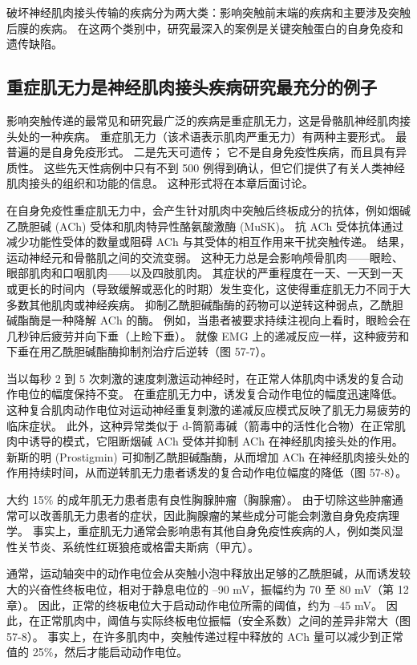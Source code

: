 破坏神经肌肉接头传输的疾病分为两大类：影响突触前末端的疾病和主要涉及突触后膜的疾病。 在这两个类别中，研究最深入的案例是关键突触蛋白的自身免疫和遗传缺陷。

\subsection{重症肌无力是神经肌肉接头疾病研究最充分的例子}
影响突触传递的最常见和研究最广泛的疾病是重症肌无力，这是骨骼肌神经肌肉接头处的一种疾病。 重症肌无力（该术语表示肌肉严重无力）有两种主要形式。 最普遍的是自身免疫形式。 二是先天可遗传； 它不是自身免疫性疾病，而且具有异质性。 这些先天性病例中只有不到 500 例得到确认，但它们提供了有关人类神经肌肉接头的组织和功能的信息。 这种形式将在本章后面讨论。

在自身免疫性重症肌无力中，会产生针对肌肉中突触后终板成分的抗体，例如烟碱乙酰胆碱 (ACh) 受体和肌肉特异性酪氨酸激酶 (MuSK)。 抗 ACh 受体抗体通过减少功能性受体的数量或阻碍 ACh 与其受体的相互作用来干扰突触传递。 结果，运动神经元和骨骼肌之间的交流变弱。 这种无力总是会影响颅骨肌肉——眼睑、眼部肌肉和口咽肌肉——以及四肢肌肉。 其症状的严重程度在一天、一天到一天或更长的时间内（导致缓解或恶化的时期）发生变化，这使得重症肌无力不同于大多数其他肌肉或神经疾病。 抑制乙酰胆碱酯酶的药物可以逆转这种弱点，乙酰胆碱酯酶是一种降解 ACh 的酶。 例如，当患者被要求持续注视向上看时，眼睑会在几秒钟后疲劳并向下垂（上睑下垂）。 就像 EMG 上的递减反应一样，这种疲劳和下垂在用乙酰胆碱酯酶抑制剂治疗后逆转（图 57-7）。

当以每秒 2 到 5 次刺激的速度刺激运动神经时，在正常人体肌肉中诱发的复合动作电位的幅度保持不变。 在重症肌无力中，诱发复合动作电位的幅度迅速降低。 这种复合肌肉动作电位对运动神经重复刺激的递减反应模式反映了肌无力易疲劳的临床症状。 此外，这种异常类似于 d-筒箭毒碱（箭毒中的活性化合物）在正常肌肉中诱导的模式，它阻断烟碱 ACh 受体并抑制 ACh 在神经肌肉接头处的作用。 新斯的明 (Prostigmin) 可抑制乙酰胆碱酯酶，从而增加 ACh 在神经肌肉接头处的作用持续时间，从而逆转肌无力患者诱发的复合动作电位幅度的降低（图 57-8）。

大约 15\% 的成年肌无力患者患有良性胸腺肿瘤（胸腺瘤）。 由于切除这些肿瘤通常可以改善肌无力患者的症状，因此胸腺瘤的某些成分可能会刺激自身免疫病理学。 事实上，重症肌无力通常会影响患有其他自身免疫性疾病的人，例如类风湿性关节炎、系统性红斑狼疮或格雷夫斯病（甲亢）。

通常，运动轴突中的动作电位会从突触小泡中释放出足够的乙酰胆碱，从而诱发较大的兴奋性终板电位，相对于静息电位的 –90 mV，振幅约为 70 至 80 mV（第 12 章）。 因此，正常的终板电位大于启动动作电位所需的阈值，约为 –45 mV。 因此，在正常肌肉中，阈值与实际终板电位振幅（安全系数）之间的差异非常大（图 57-8）。 事实上，在许多肌肉中，突触传递过程中释放的 ACh 量可以减少到正常值的 25\%，然后才能启动动作电位。

